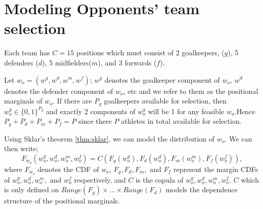 \documentclass[12pt,oneside,a4paper]{book}
\theoremstyle{definition}
\theoremstyle{remark}
\begin{document}


		\section{Modeling Opponents' team selection}
			Each team has $C=15$ positions which must consist of 2 goalkeepers, ($g$), 5 defenders ($d$), 5 midfielders($m$), and 3 forwards ($f$).

			Let $w_o = (w^g,w^d,w^m,w^f)$; $w^g$ denotes the goalkeeper component of $w_o$, $w^d$ denotes the defender component of $w_o$, etc and we refer to them as the positional marginals of $w_o$. If there are $P_g$ goalkeepers available for selection, then $w_o^g \in \{0,1\}^{P_g}$ and exactly 2 components of $w_o^g$ will be 1 for any feasible $w_o$.Hence $P_g+P_d+P_m+P_f=P$ since there $P$ athletes in total available for selection.

			Using Sklar's theorem \ref{thm:sklar}, we can model the distribution of $w_o$. We can then write;
			\begin{equation}\label{Eq:sklarapp}
				F_{w_o}(w^g_o,w^d_o,w^m_o,w^f_o) = C(F_g(w^g_o),F_d(w^d_o),F_m(w^m_o),F_f(w^f_o)),
			\end{equation}
			where $F_{w_o}$ denotes the CDF of $w_o$, $F_g, F_d, F_m, \text{ and }F_f$ represent the margin CDFs of $w_o^g, w_o^d, w_o^m, \text{ and } w_o^f$ respectively, and $C$ is the copula of $w_o^g,w_o^d,w_o^m,w_o^f$.
			$C$ which is only defined on $Range(F_g)\times \dots \times Range(F_d)$ models the dependence structure of the positional marginals.
\end{document}
